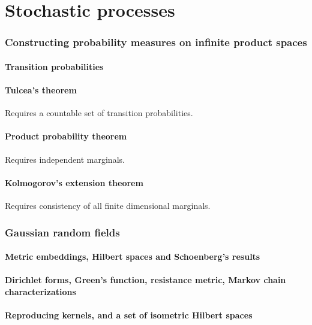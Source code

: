 \part{Stochastic processes}


\section{Constructing probability measures on infinite product spaces}
\subsection{Transition probabilities}
\subsection{Tulcea's theorem}
Requires a countable set of transition probabilities.
\subsection{Product probability theorem}
Requires independent marginals.
\subsection{Kolmogorov's extension theorem}
Requires consistency of all finite dimensional marginals.


\section{Gaussian random fields}

\subsection{Metric embeddings, Hilbert spaces and Schoenberg's results}
\subsection{Dirichlet forms, Green's function, resistance metric, Markov chain characterizations}
\subsection{Reproducing kernels, and a set of isometric Hilbert spaces}

